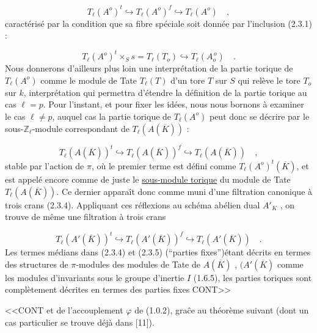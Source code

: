 \begin{equation}\tag{2.3.2}
T_\ell(A^o)^t \hookrightarrow T_\ell(A^o)^f \hookrightarrow T_\ell(A^o) \quad ,
\end{equation}
caractérisé par la condition que sa fibre spéciale soit donnée par l'inclusion (2.3.1) :

\begin{equation}\tag{2.3.3}
T_\ell(A^o)^t \times_S s = T_\ell(T_o) \hookrightarrow T_\ell(A_o^{\,o}) \quad .
\end{equation}
Nous donnerons d'ailleurs plus loin une interprétation de la partie torique de $T_\ell(A^o)$ comme le module de Tate $T_\ell(T)$ d'un tore $T$ sur $S$ qui relève le tore $T_o$ sur $k$, interprétation qui permettra d'étendre la définition de la partie torique au cas $\ell = p$. Pour l'instant, et pour fixer les idées, nous nous bornons à examiner le cas $\ell \neq p$, auquel cas la partie torique de $T_\ell(A^o)$ peut donc se décrire par le sous-$\mathbb{Z}_\ell$-module correspondant de $T_\ell(A(\overline{K}))$ :

\begin{equation}\tag{2.3.4}
T_\ell(A(\overline{K}))^t \hookrightarrow T_\ell(A(\overline{K}))^f \hookrightarrow T_\ell(A(\overline{K})) \quad ,
\end{equation}
stable par l'action de $\pi$, où le premier terme est défini comme $T_\ell(A^o)^t(\overline{K})$, et est appelé encore comme de juste le \underline{sous-module torique} du module de Tate $T_\ell(A(\overline{K}))$. Ce dernier apparaît donc comme muni d'une filtration canonique à trois crans (2.3.4). Appliquant ces réflexions au schéma abélien dual $A'_K$ , on trouve de même une filtration à trois crans

\begin{equation}\tag{2.3.5}
T_\ell(A'(\overline{K}))^t \hookrightarrow T_\ell(A'(\overline{K}))^f \hookrightarrow T_\ell(A'(\overline{K})) \quad .
\end{equation}
Les termes médians dans (2.3.4) et (2.3.5) (``parties fixes'')étant décrits en termes des structures de $\pi$-modules des modules de Tate de $A(\overline{K})$ , $(A'(\overline{K})$ comme les modules d'invariants sous le groupe d'inertie $I$ (1.6.5), les parties toriques sont complètement décrites en termes des parties fixes CONT>>



<<CONT et de l'accouplement $\varphi$ de (1.0.2), gra\^ce au théorème suivant (dont un cas particulier se trouve déjà dans [11]).

